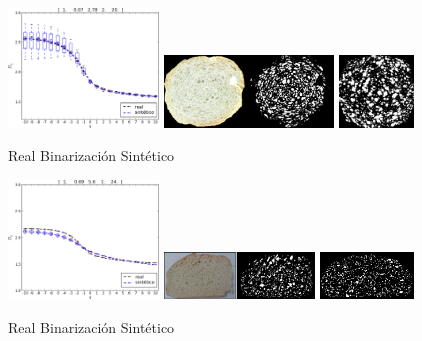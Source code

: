 \documentclass[spanish,unknownkeysallowed,10pt]{beamer}
\begin{document}
\begin{frame}
\includegraphics[width=4cm]{../figures/bestboxplot}
\includegraphics[width=4.5cm]{../figures/realbin}
\includegraphics[width=2cm]{../figures/best}

\hspace{4.7cm} Real \hspace{0.6cm} Binarización \hspace{0.5cm} Sintético

\includegraphics[width=4cm]{../figures/bestboxplot2}
\includegraphics[width=4cm]{../figures/realbin2}
\includegraphics[width=2.5cm]{../figures/best2}

\hspace{4.7cm} Real \hspace{0.5cm} Binarización \hspace{0.5cm} Sintético
\end{frame}
\end{document}
